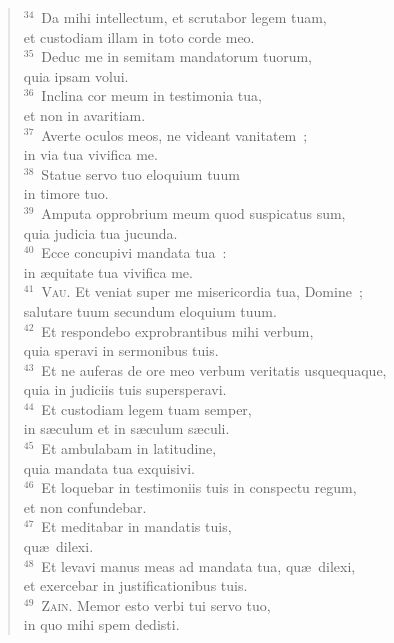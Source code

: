 \begin{verse}
${}^{34}$~Da mihi intellectum, et scrutabor legem tuam,\\ et custodiam illam in toto corde meo.\\
${}^{35}$~Deduc me in semitam mandatorum tuorum,\\ quia ipsam volui.\\
${}^{36}$~Inclina cor meum in testimonia tua,\\ et non in avaritiam.\\
${}^{37}$~Averte oculos meos, ne videant vanitatem~;\\ in via tua vivifica me.\\
${}^{38}$~Statue servo tuo eloquium tuum\\ in timore tuo.\\
${}^{39}$~Amputa opprobrium meum quod suspicatus sum,\\ quia judicia tua jucunda.\\
${}^{40}$~Ecce concupivi mandata tua~:\\ in \ae quitate tua vivifica me.\\
${}^{41}$~\textsc{Vau.} Et veniat super me misericordia tua, Domine~;\\ salutare tuum secundum eloquium tuum.\\
${}^{42}$~Et respondebo exprobrantibus mihi verbum,\\ quia speravi in sermonibus tuis.\\
${}^{43}$~Et ne auferas de ore meo verbum veritatis usquequaque,\\ quia in judiciis tuis supersperavi.\\
${}^{44}$~Et custodiam legem tuam semper,\\ in s\ae culum et in s\ae culum s\ae culi.\\
${}^{45}$~Et ambulabam in latitudine,\\ quia mandata tua exquisivi.\\
${}^{46}$~Et loquebar in testimoniis tuis in conspectu regum,\\ et non confundebar.\\
${}^{47}$~Et meditabar in mandatis tuis,\\ qu\ae\ dilexi.\\
${}^{48}$~Et levavi manus meas ad mandata tua, qu\ae\ dilexi,\\ et exercebar in justificationibus tuis.\\
${}^{49}$~\textsc{Zain.} Memor esto verbi tui servo tuo,\\ in quo mihi spem dedisti.\\

\end{verse}
